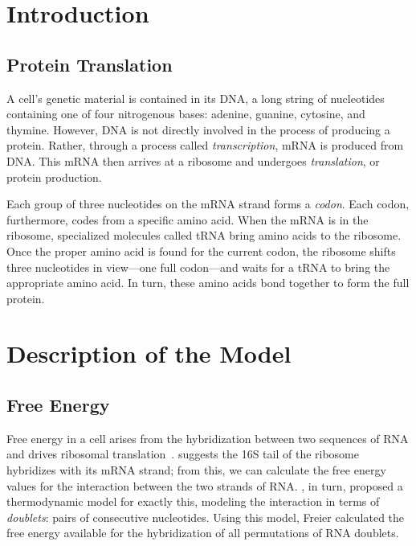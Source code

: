 \documentclass[12pt]{article}
\numberwithin{equation}{section}
\begin{document}
\tableofcontents

\section{Introduction}

\subsection{Protein Translation}

A cell's genetic material is contained in its DNA, a long string
of nucleotides containing one of four nitrogenous bases: adenine,
guanine, cytosine, and thymine.  However, DNA is not
directly involved in the process of producing a protein.  Rather, through
a process called \emph{transcription}, mRNA is produced from DNA.
This mRNA then arrives at a ribosome and undergoes \emph{translation}, or
protein production.

Each group of three nucleotides on the mRNA strand forms a \emph{codon}.
Each codon, furthermore, codes from a specific amino acid.  When the mRNA
is in the ribosome, specialized molecules called tRNA bring amino acids
to the ribosome.  Once the proper amino acid is found for the current codon,
the ribosome shifts three nucleotides in view---one full codon---and waits
for a tRNA to bring the appropriate amino acid.  In turn, these amino acids
bond together to form the full protein.

\section{Description of the Model}
\label{allmodel}
\subsection{Free Energy}
\label{freeenergy}

Free energy in a cell arises from the hybridization between two
sequences of RNA and drives ribosomal translation~\cite{starmer}.
\citet{weiss88} suggests the 16S tail of the ribosome hybridizes with its mRNA strand;
from this, we can calculate the free energy values for the interaction between the two strands of RNA.
\citet{freier}, in turn, proposed a thermodynamic model for exactly this,
modeling the interaction in terms of \emph{doublets}: pairs of consecutive nucleotides.
Using this model, Freier calculated the free energy available
for the hybridization of all permutations of RNA doublets.
\end{document}
